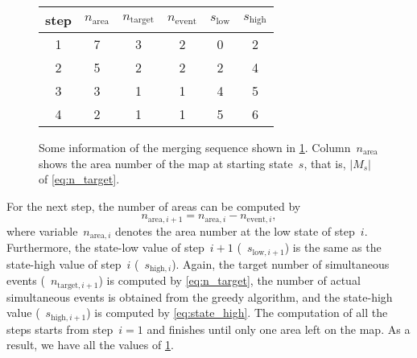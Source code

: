 \documentclass[twocolumn]{svjour3}          %
\begin{document}
\begin{figure}[h]
%
%
%
\captionsetup*{type=table} %
\caption{Some information of the merging sequence shown in \tabl\ref{tbl:sequence_greedy}.
Column~$n_\mathrm{area}$ shows the area number of the map at starting state~$s$,
that is, $|M_s|$ of \eq\ref{eq:n_target}.
}
\label{tbl:sequence_greedy}
\centering
\begin{tabular}{cccccc}
\toprule
step & $n_\mathrm{area}$ & $n_\mathrm{target}$ 
& $n_\mathrm{event}$ & $s_\mathrm{low}$ & $s_\mathrm{high}$ \\ \midrule
1        & 7      & 3        & 2        & 0      & 2      \\
2        & 5      & 2        & 2        & 2      & 4      \\
3        & 3      & 1        & 1        & 4      & 5      \\
4        & 2      & 1        & 1        & 5      & 6      \\
\bottomrule
\end{tabular}
\end{figure}

For the next step, the number of areas can be computed by
$$
n_{\mathrm{area},i+1} = n_{\mathrm{area},i} - n_{\mathrm{event},i},
$$
where variable~$n_{\mathrm{area},i}$ denotes the area number 
at the low state of step~$i$.
Furthermore, the state-low value of step~$i+1$ (\ie~$s_{\mathrm{low},i+1}$) 
is the same as the state-high value of step~$i$ (\ie~$s_{\mathrm{high},i}$).
Again, the target number of simultaneous events (\ie~$n_{\mathrm{target},i+1}$)
is computed by \eq\ref{eq:n_target},
the number of actual simultaneous events is obtained from the greedy algorithm,
and the state-high value (\ie~$s_{\mathrm{high},i+1}$) 
is computed by \eq\ref{eq:state_high}.
The computation of all the steps starts from step~$i=1$ and 
finishes until only one area left on the map.
As a result, we have all the values of \tabl\ref{tbl:sequence_greedy}.
\end{document}
